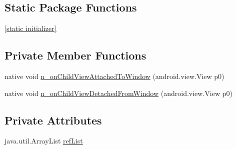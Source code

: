 \subsection*{Static Package Functions}
\begin{CompactItemize}
\item 
\hyperlink{classmono_1_1android_1_1support_1_1v7_1_1widget_1_1_recycler_view___on_child_attach_state_change_listener_implementor_8246ff80faedc2667f06bd8597adb0ad}{\mbox{[}static initializer\mbox{]}}
\end{CompactItemize}
\subsection*{Private Member Functions}
\begin{CompactItemize}
\item 
native void \hyperlink{classmono_1_1android_1_1support_1_1v7_1_1widget_1_1_recycler_view___on_child_attach_state_change_listener_implementor_f199f6abc491c33f147fbccb788f2be3}{n\_\-onChildViewAttachedToWindow} (android.view.View p0)
\item 
native void \hyperlink{classmono_1_1android_1_1support_1_1v7_1_1widget_1_1_recycler_view___on_child_attach_state_change_listener_implementor_80552e376c98263fa07acb2f3835167a}{n\_\-onChildViewDetachedFromWindow} (android.view.View p0)
\end{CompactItemize}
\subsection*{Private Attributes}
\begin{CompactItemize}
\item 
java.util.ArrayList \hyperlink{classmono_1_1android_1_1support_1_1v7_1_1widget_1_1_recycler_view___on_child_attach_state_change_listener_implementor_e6e21c96d1a382ab9e0af61a3598e6a5}{refList}
\end{CompactItemize}


